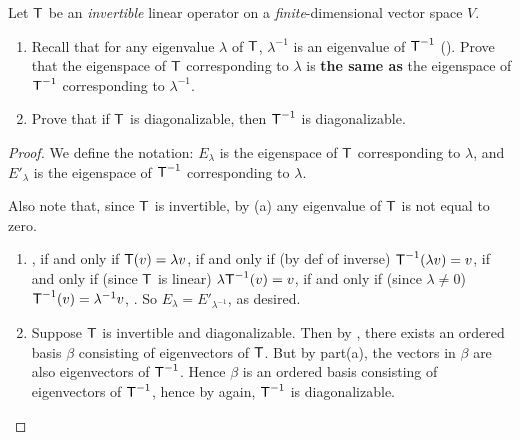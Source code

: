 \begin{exercise} \label{exercise 5.2.13}
Let \(\textsf{T}\) be an \emph{invertible} linear operator on a \emph{finite}-dimensional vector space \(V\).
\begin{enumerate}
\item Recall that for any eigenvalue \(\lambda\) of \(\textsf{T}\), \(\lambda^{-1}\) is an eigenvalue of \(\textsf{T}^{-1}\) ().
Prove that the eigenspace of \(\textsf{T}\) corresponding to \(\lambda\) is \textbf{the same as} the eigenspace of \(\textsf{T}^{-1}\) corresponding to \(\lambda^{-1}\).
\item Prove that if \(\textsf{T}\) is diagonalizable, then \(\textsf{T}^{-1}\) is diagonalizable.
\end{enumerate}
\end{exercise}

\begin{proof}
We define the notation: \(E_{\lambda}\) is the eigenspace of \(\textsf{T}\) corresponding to \(\lambda\), and \(E'_{\lambda}\) is the eigenspace of \(\textsf{T}^{-1}\) corresponding to \(\lambda\).

Also note that, since \(\textsf{T}\) is invertible, by (a) any eigenvalue of \(\textsf{T}\) is not equal to zero.

\begin{enumerate}
\item {}, if and only if \(\textsf{T}(v) = \lambda v\), if and only if (by def of inverse) \(\textsf{T}^{-1} (\lambda v) = v\), if and only if (since \(\textsf{T}\) is linear) \(\lambda \textsf{T}^{-1}(v) = v\), if and only if (since \(\lambda \ne 0\)) \(\textsf{T}^{-1}(v) = \lambda^{-1} v\), .
So \(E_{\lambda} = E'_{\lambda^{-1}}\), as desired.

\item Suppose \(\textsf{T}\) is invertible and diagonalizable.
Then by , there exists an ordered basis \(\beta\) consisting of eigenvectors of \(\textsf{T}\).
But by part(a), the vectors in \(\beta\) are also eigenvectors of \(\textsf{T}^{-1}\).
Hence \(\beta\) is an ordered basis consisting of eigenvectors of \(\textsf{T}^{-1}\), hence by  again, \(\textsf{T}^{-1}\) is diagonalizable.
\end{enumerate}
\end{proof}

